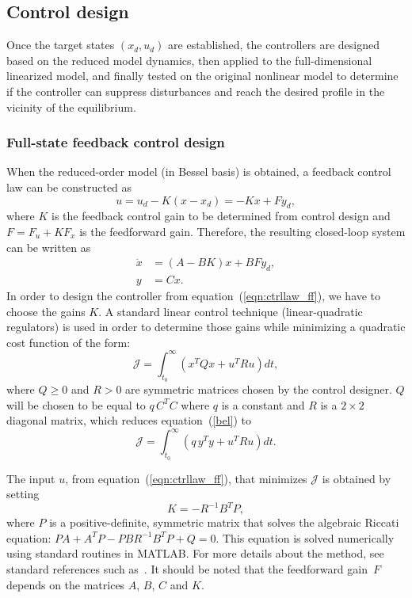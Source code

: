 \documentclass[12pt,lot, lof]{puthesis}
\begin{document}
 
\subsection{Control design} 
Once the target states $\left( x_{d} , u_{d} \right)$ are established, the controllers are designed based on the reduced model dynamics, then applied to the full-dimensional linearized model, and finally tested on the original nonlinear model to determine if the controller can suppress disturbances and reach the desired profile in the vicinity of the equilibrium.


\subsubsection{Full-state feedback control design} 

When the reduced-order model (in Bessel basis) is obtained, a feedback control law can be constructed as
\begin{equation}
   u = u_{d} - K(x - x_{d}) = - Kx + Fy_{d},
   \label{eqn:ctrllaw_ff}
\end{equation}
where $K$ is the feedback control gain to be determined from control design and $F = F_u + K F_x$ is the feedforward gain.  Therefore, the resulting closed-loop system can be written as
\begin{equation}
\begin{aligned}
      \dot{x} &= (A-BK) x + BF y_{d}, \\
      y &= C x.
\end{aligned}\label{eq:4}
\end{equation}
In order to design the controller from equation~(\ref{eqn:ctrllaw_ff}), we have to choose the gains $K$.
A  standard linear control technique (linear-quadratic regulators) is used in order to determine those gains while minimizing a quadratic cost function of the form:
\begin{equation}
 \mathcal{J} = \int_{t_0}^\infty \left( x^T Q x + u^T R u \right) dt,
 \label{bel}
\end{equation}
where $Q\ge 0$ and $R>0$ are symmetric matrices chosen by the control designer. $Q$ will be chosen to be equal to $q \, C^{T} C$ where $q$ is a constant and $R$ is a $2 \times 2$ diagonal matrix, which reduces equation~(\ref{bel}) to
\begin{equation}
   \mathcal{J} = \int_{t_0}^\infty \left( q \, y^T y + u^T R u \right) dt.
\end{equation}

 
The input $u$, from equation~(\ref{eqn:ctrllaw_ff}), that minimizes $\mathcal{J}$ is obtained by setting
\begin{equation}
   K  = - R^{-1} B^T P,
\end{equation}
where $P$ is a positive-definite, symmetric matrix that solves the algebraic Riccati equation: $P {A} + {A}^T P - P {B} R^{-1} B^T P + Q = 0$.  This equation is solved numerically using standard routines in MATLAB. For more details about the method, see standard references such as~\cite{SandP, AandM}.
It should be noted that the feedforward gain~$F$  depends on the matrices $A$, $B$, $C$ and $K$.
\end{document}
